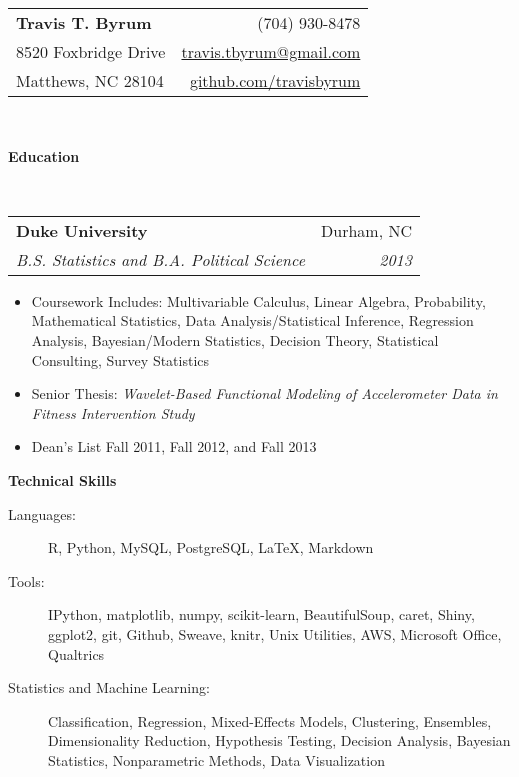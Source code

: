 \documentclass[letterpaper,12pt]{article}
\makeatletter
\newcommand{\resitem}[1]{\item #1 \vspace{-2pt}}
\newcommand{\resheading}[1]{{\large \colorbox{mygrey}{\begin{minipage}{\textwidth}{\textbf{#1 \vphantom{p\^{E}}}}\end{minipage}}}}
\newcommand{\ressubheading}[4]{
\begin{tabular*}{6.9in}{l@{\extracolsep{\fill}}r}
		\textbf{#1} & #2 \\
		\textit{#3} & \textit{#4} \\
\end{tabular*}\vspace{-6pt}}
\makeatother
\begin{document}
\newcommand{\mywebheader}{
\begin{tabular*}
	{7in}
	{l@{\extracolsep{\fill}}r}
		\textbf{\Huge Travis T. Byrum}  & (704) 930-8478\\
		8520 Foxbridge Drive & \href{mailto:travis.tbyrum@gmail.com}{travis.tbyrum@gmail.com} \\
		Matthews, NC 28104 & \href{https://github.com/travisbyrum}{github.com/travisbyrum}\\
\end{tabular*}
\\
\vspace{0.1in}}

\mywebheader
\resheading{Education}
\\
\ressubheading
  {Duke University}
  {Durham, NC}
  {B.S. Statistics and B.A. Political Science}
  {2013}
  {
	  \footnotesize
		  \begin{itemize}
			  \resitem{Coursework Includes: Multivariable Calculus, Linear Algebra, Probability, Mathematical Statistics, Data Analysis/Statistical Inference, 
			  Regression Analysis, Bayesian/Modern Statistics, Decision Theory, Statistical Consulting, Survey Statistics}
			  \resitem{Senior Thesis: \textit{Wavelet-Based Functional Modeling of Accelerometer Data in Fitness Intervention Study}} 
			  \resitem{Dean's List Fall 2011, Fall 2012, and Fall 2013} 
		  \end{itemize}

\resheading
  {Technical Skills}
	\begin{description}
		\item[Languages:]{\footnotesize R, Python, MySQL, PostgreSQL, \LaTeX, Markdown}
		\item[Tools:]{\footnotesize IPython, matplotlib, numpy, scikit-learn, BeautifulSoup, caret, Shiny, ggplot2, git, Github, Sweave, knitr,
        Unix Utilities, AWS, Microsoft Office, Qualtrics}
		\item[Statistics and Machine Learning:]{\footnotesize Classification, Regression, Mixed-Effects Models, Clustering, Ensembles,
        Dimensionality Reduction, Hypothesis Testing, Decision Analysis, Bayesian Statistics, Nonparametric Methods, Data Visualization}
	\end{description}

}
\end{document}
